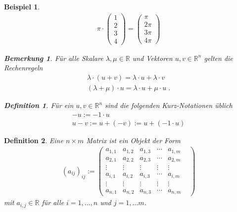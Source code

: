 \documentclass[]{article}
\newtheorem{Definition}{Definition}
\newtheorem{Beispiel}{Beispiel}
\newtheorem{Bemerkung}{Bemerkung}
\begin{document}
\begin{Beispiel}
 
\begin{align*}
\pi \cdot
\begin{pmatrix}
1 \\ 2  \\  3 \\ 4
\end{pmatrix}  
=  \begin{pmatrix}
\pi   \\ 2  \pi  \\  3 \pi \\  4  \pi
\end{pmatrix} 
\end{align*}

\begin{Bemerkung}
Für alle Skalare $\lambda, \mu \in \mathbb{R}$ und Vektoren $u,v \in  \mathbb{R}^n$ gelten die  Rechenregeln
\begin{align*}
\lambda \cdot (u +v) = \lambda \cdot u + \lambda \cdot v \\
(\lambda + \mu)  \cdot u  = \lambda  \cdot u + \mu  \cdot u \; .
\end{align*}
\end{Bemerkung}

\begin{Definition}
Für ein $u,v \in  \mathbb{R}^n$ sind die folgenden Kurz-Notationen üblich
\begin{align*}
-u :=  -1 \cdot u \\
u -v := u + (-v) := u + (-1 \cdot u) 
\end{align*}  
\end{Definition}
\end{Beispiel}

\begin{Definition}
Eine $n \times m$ Matrix ist ein Objekt der Form
\begin{align*}
(a_{ij})_{ij} := \begin{pmatrix}
a_{1,1} &  a_{1,2} & a_{1,3} & \cdots & a_{1,m}   \\  
a_{2,1} &  a_{2,2} & a_{2,3} & \cdots & a_{2,m} \\  
 \vdots &  \vdots &\vdots & \vdots & \vdots & \\ 
a_{i,1} &  a_{i,2} & a_{i,3} & \cdots & a_{i,m} \\
 \vdots &  \vdots &\vdots & \vdots & \vdots & \\ 
a_{n,1} &  a_{n,2} & a_{n,3} & \cdots & a_{n,m}  
\end{pmatrix}  
\end{align*} 
mit $a_{i,j} \in \mathbb{R}$ für alle $i = 1, \hdots, n$ und $j = 1, \hdots m$.
\end{Definition}
\end{document}
